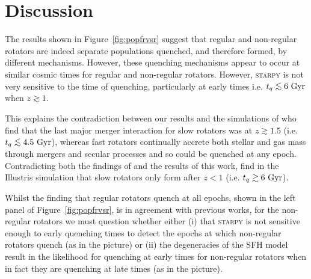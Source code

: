 \documentclass[useAMS,usenatbib]{mn2e}
\def\lesssim{\mathrel{\hbox{\rlap{\hbox{\lower3pt\hbox{$\sim$}}}\hbox{\raise2pt\hbox{$<$}}}}}
\begin{document}
\section{Discussion}\label{sec:discussion}

The results shown in Figure~\ref{fig:popfrvsr} suggest that regular and non-regular rotators are indeed separate populations quenched, and therefore formed, by different mechanisms. However, these quenching mechanisms appear to occur at similar cosmic times for regular and non-regular rotators. However, \textsc{starpy} is not very sensitive to the time of quenching, particularly at early times i.e. $t_q \lesssim 6~\rm{Gyr}$ when $z \gtrsim 1$. 

This explains the contradiction between our results and the simulations of \cite{khochfar11} who find that the last major merger interaction for slow rotators was at $z \gtrsim 1.5$ (i.e. $t_q \lesssim 4.5~\rm{Gyr}$), whereas fast rotators continually accrete both stellar and gas mass through mergers and secular processes and so could be quenched at any epoch. Contradicting both the findings of \cite{khochfar11} and the results of this work, \cite{penoyre17} find in the Illustris simulation that slow rotators only form after $z < 1$ (i.e. $t_q \gtrsim 6~\rm{Gyr}$). 

Whilst the finding that regular rotators quench at all epochs, shown in the left panel of Figure~\ref{fig:popfrvsr}, is in agreement with previous works, for the non-regular rotators we must question whether either (i) that \textsc{starpy} is not sensitive enough to early quenching times to detect the epochs at which non-regular rotators quench (as in the \citealt{khochfar11} picture) or (ii) the degeneracies of the SFH model result in the likelihood for quenching at early times for non-regular rotators when in fact they are quenching at late times (as in the \citealt{penoyre17} picture).
\end{document}
